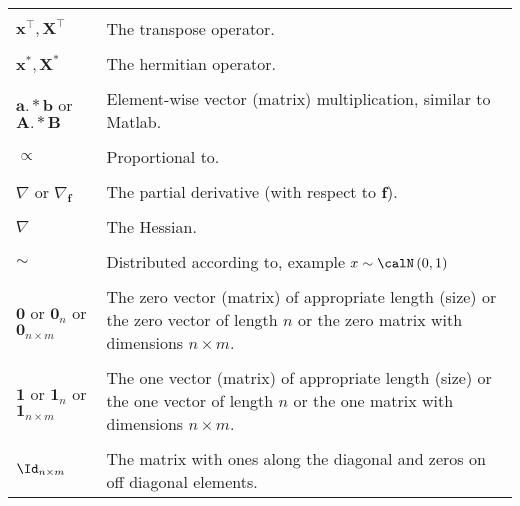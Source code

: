 \begin{longtable}{lp{}}
    \\\\
    $\bm{x}^{\intercal}, \bm{X}^{\intercal}$                                                                   & The transpose operator.
    \\\\
    $\bm{x}^{\ast}, \bm{X}^{\ast}$                                                                             & The hermitian operator.
    \\\\
    $\bm{a} .\ast \bm{b}$ or $\bm{A} .\ast \bm{B}$                                                             & Element-wise vector (matrix) multiplication, similar to Matlab.
    \\\\
    $\propto$                                                                                                  & Proportional to.
    \\\\
    $\nabla$ or $\nabla_{\bm{f}}$                                                                              & The partial derivative (with respect to $\bm{f}$).
    \\\\
    $\nabla$                                                                                                   & The Hessian.
    \\\\
    $\sim$                                                                                                     & Distributed according to, example $x \sim \calN \left( 0,1 \right)$
    \\\\
    $\bm{0}$ or $\bm{0}_{n}$ or $\bm{0}_{n \times m}$                                                          & The zero vector (matrix) of appropriate length (size) or the zero vector of length $n$ or the zero matrix with dimensions $n \times m$.
    \\\\
    $\bm{1}$ or $\bm{1}_{n}$ or $\bm{1}_{n \times m}$                                                          & The one vector (matrix) of appropriate length (size) or the one vector of length $n$ or the one matrix with dimensions $n \times m$.
    \\\\
    $\Id_{n \times m}$                                                                                         & The matrix with ones along the diagonal and zeros on off diagonal elements.

\end{longtable}
